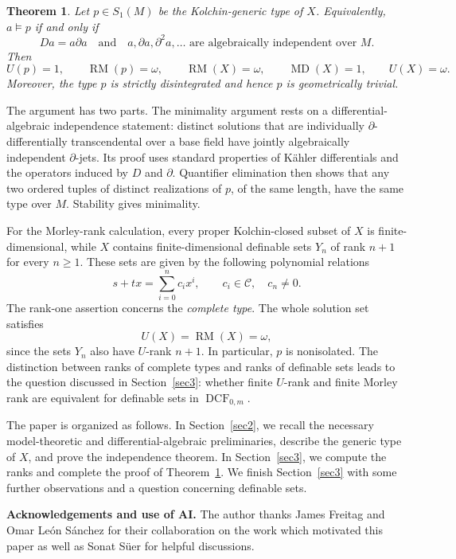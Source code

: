 \documentclass[11pt,a4paper]{amsart}
\newtheorem{theorem}{Theorem}[section]
\theoremstyle{definition}
\newcommand{\DCF}{\operatorname{DCF}}
\newcommand{\RM}{\operatorname{RM}}
\newcommand{\MD}{\operatorname{MD}}
\newcommand{\C}{\mathcal C}
\begin{document}
\begin{theorem}\label{main}
Let $p\in S_1(M)$ be the Kolchin-generic type of $X$. Equivalently,
$a\models p$ if and only if
\[
 Da=a\partial a
 \quad\text{and}\quad
 a,\partial a,\partial^2a,\ldots
 \text{ are algebraically independent over }M.
\]
Then
\[
 U(p)=1,\qquad \RM(p)=\omega, \qquad  \RM(X)=\omega,\qquad \MD(X)=1,\qquad U(X)=\omega.
\]
Moreover, the type $p$ is strictly disintegrated and hence $p$ is geometrically trivial.
\end{theorem}

The argument has two parts. The minimality argument rests on a
differential-algebraic independence statement: distinct solutions
that are individually $\partial$-differentially transcendental over
a base field have jointly algebraically independent
$\partial$-jets. Its proof uses standard properties of K\"ahler
differentials and the operators induced by $D$ and $\partial$.
Quantifier elimination then shows that any two ordered tuples
of distinct realizations of $p$, of the same length, have the
same type over $M$. Stability gives minimality.

For the Morley-rank calculation, every proper Kolchin-closed
subset of $X$ is finite-dimensional, while $X$ contains
finite-dimensional definable sets $Y_n$ of rank $n+1$ for every
$n\geqslant1$. These sets are given by the following polynomial
relations
\[
 s+tx=\sum_{i=0}^{n}c_i x^i,
 \qquad c_i\in\C,\quad c_n\neq0.
\]
The rank-one assertion concerns the \emph{complete type}.
The whole solution set satisfies
\[
 U(X)=\RM(X)=\omega,
\]
since the sets $Y_n$ also have $U$-rank $n+1$. In particular,
$p$ is nonisolated. The distinction between ranks of complete
types and ranks of definable sets leads to the question discussed
in Section~\ref{sec3}: whether finite $U$-rank and finite Morley rank are
equivalent for definable sets in $\DCF_{0,m}$.

The paper is organized as follows. In Section~\ref{sec2}, we recall the
necessary model-theoretic and differential-algebraic preliminaries,
describe the generic type of $X$, and prove the independence
theorem. In Section~\ref{sec3}, we compute the ranks and complete the proof
of Theorem~\ref{main}. We finish Section~\ref{sec3} with some further observations and
a question concerning definable sets.

\medskip
\noindent
\textbf{Acknowledgements and use of AI.}
The author thanks James Freitag and Omar Le\'on S\'anchez for their
collaboration on the work which motivated this paper as well as Sonat S\"{u}er for helpful discussions.
\end{document}
